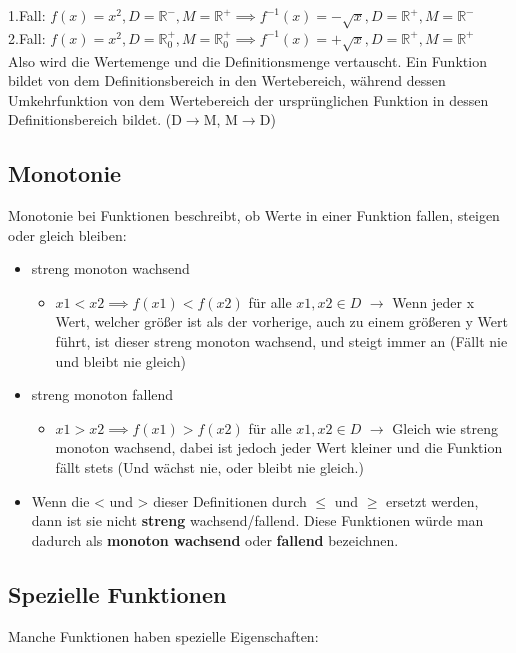\documentclass{article}
\newcommand{\R}{\mathbb{R}}
\begin{document}
	1.Fall: $f(x)=x^2, D=\R^-, M=\R^+ \implies f^{-1}(x)=-\sqrt{x}, D=\R^+, M=\R^-$ \\
	2.Fall: $f(x)=x^2, D=\R^{+}_{0}, M=\R^{+}_{0} \implies f^{-1}(x)=+\sqrt{x}, D=\R^+, M=\R^+$ \\
	Also wird die Wertemenge und die Definitionsmenge vertauscht. Ein Funktion bildet von dem Definitionsbereich in den Wertebereich, während dessen Umkehrfunktion von dem Wertebereich der ursprünglichen Funktion in dessen Definitionsbereich bildet. (D$\to$M, M$\to$D)
	\subsection{Monotonie}
	Monotonie bei Funktionen beschreibt, ob Werte in einer Funktion fallen, steigen oder gleich bleiben:
	\begin{itemize}
		\item{streng monoton wachsend}
		\begin{itemize}
			\item{$x1 < x2 \implies f(x1) < f(x2)$ für alle $x1, x2\in D$ $\to$ Wenn jeder x Wert, welcher größer ist als der vorherige, auch zu einem größeren y Wert führt, ist dieser streng monoton wachsend, und steigt immer an (Fällt nie und bleibt nie gleich)}
		\end{itemize}
		\item{streng monoton fallend}
		\begin{itemize}
			\item{$x1 > x2 \implies f(x1)>f(x2)$ für alle $x1,x2\in D$ $\to$ Gleich wie streng monoton wachsend, dabei ist jedoch jeder Wert kleiner und die Funktion fällt stets (Und wächst nie, oder bleibt nie gleich.)}
		\end{itemize}
		\item{Wenn die < und > dieser Definitionen durch $\leq$ und $\geq$ ersetzt werden, dann ist sie nicht \textbf{streng} wachsend/fallend. Diese Funktionen würde man dadurch als \textbf{monoton wachsend} oder \textbf{fallend} bezeichnen.}
	\end{itemize}
	\subsection{Spezielle Funktionen}
	Manche Funktionen haben spezielle Eigenschaften:
\end{document}

